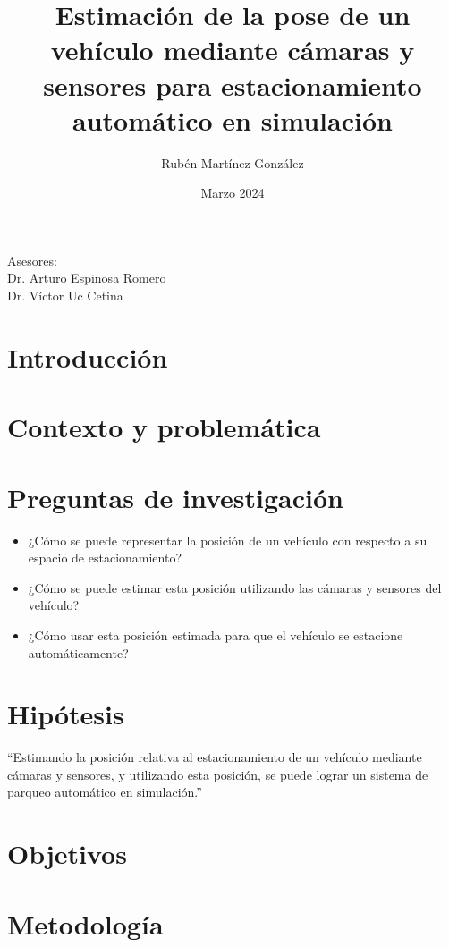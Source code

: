 \documentclass[12pt,letterpaper,final]{article}
\title{Estimación de la pose de un vehículo mediante cámaras y sensores para estacionamiento automático en simulación}
\author{Rubén Martínez González}
\date{Marzo 2024}
\begin{document}
    \maketitle
    \begin{center}
        Asesores: \\Dr. Arturo Espinosa Romero\\ Dr. Víctor Uc Cetina

    \end{center}
    \clearpage

    \section*{Introducción}
    
    \clearpage

    \section*{Contexto y problemática}
    
    \clearpage

    \section*{Preguntas de investigación}
    \begin{itemize}
        \item ¿Cómo se puede representar la posición de un vehículo con respecto a su espacio de estacionamiento?
        \item ¿Cómo se puede estimar esta posición utilizando las cámaras y sensores del vehículo?
        \item ¿Cómo usar esta posición estimada para que el vehículo se estacione automáticamente?
    \end{itemize}

    \section*{Hipótesis}
    ``Estimando la posición relativa al estacionamiento de un vehículo mediante cámaras y sensores,
    y utilizando esta posición, se puede lograr un sistema de parqueo automático en simulación.''

    \section*{Objetivos}
    
    \clearpage

    \section*{Metodología}
    \justify
    
\end{document}

